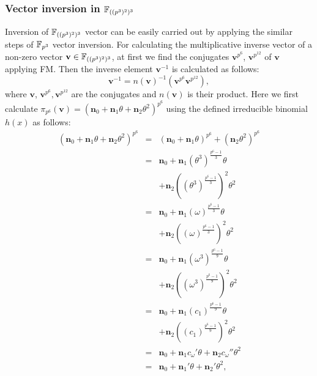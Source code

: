 \subsubsection{Vector inversion in $\mathbb{F}_{((p^3)^2)^3}$}
Inversion of $\mathbb{F}_{((p^3)^2)^3}$ vector can be easily carried out by applying the similar steps of $\mathbb{F}_{p^3}$ vector inversion. 
For calculating the multiplicative inverse vector of a non-zero vector $\textbf{v}\in \mathbb{F}_{((p^3)^2)^3}$, at first we find the conjugates $\textbf{v}^{p^6}$, $\textbf{v}^{p^{12}}$ of $\textbf{v}$ applying FM. Then the inverse element $\textbf{v}^{-1}$  is calculated as follows:
\begin{equation}
\textbf{v}^{-1} = n(\textbf{v})^{-1}(\textbf{v}^{p^6}\textbf{v}^{p^{12}}), \label{InvCal_fq_3_2_3}
\end{equation}
where  $\textbf{v}$, $\textbf{v}^{p^6},\textbf{v}^{p^{12}}$ are the conjugates and $n(\textbf{v})$ is their product. Here we first calculate $\pi_{p^6}(\textbf{v})  =  (\textbf{n}_0+\textbf{n}_1\theta + \textbf{n}_2 \theta^2)^{p^6}$ using the defined irreducible binomial $h(x)$ as follows:
\begin{eqnarray}\label{eq:FM_fq_3_2_3}
(\textbf{n}_0+\textbf{n}_1\theta+\textbf{n}_2 \theta^2)^{p^6} & = & (\textbf{n}_0 + \textbf{n}_1 \theta)^{p^6}+ (\textbf{n}_2 \theta^2)^{p^6} \nonumber\\
& = & \textbf{n}_0+\textbf{n}_1(\theta^3)^{\frac{p^6-1}{3}}\theta  \nonumber \\ 
& & + \textbf{n}_2 ((\theta^3)^{\frac{p^6-1}{3}})^2 \theta^2  \nonumber \\ 
& = & \textbf{n}_0+\textbf{n}_1(\omega)^{\frac{p^6-1}{3}} \theta  \nonumber \\
& & + \textbf{n}_2 ((\omega)^{\frac{p^6-1}{3}})^2 \theta^2 \nonumber \\
& = & \textbf{n}_0+\textbf{n}_1(\omega^3)^{\frac{p^6-1}{9}} \theta  \nonumber \\
& & + \textbf{n}_2 ((\omega^3)^{\frac{p^6-1}{9}})^2 \theta^2 \nonumber \\
& = & \textbf{n}_0+\textbf{n}_1(c_1)^{\frac{p^6-1}{9}} \theta  \nonumber \\
& & + \textbf{n}_2 ((c_1)^{\frac{p^6-1}{9}})^2 \theta^2 \nonumber \\
& = & \textbf{n}_0 + \textbf{n}_1 c_{\omega}' \theta + \textbf{n}_2 c_{\omega}'' \theta^2 \nonumber \\
& = & \textbf{n}_0 + \textbf{n}_1' \theta + \textbf{n}_2' \theta^2 ,
\end{eqnarray}

